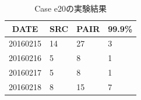 \documentclass[twocolumn,9pt]{ltjsarticle}
\begin{document}
\begin{table}[htbp]
    \centering
    \caption{Case e20の実験結果}

    \begin{tabular}{c||lll}
        \hline
        DATE & SRC & PAIR & 99.9\% \\
        \hline \hline
        20160215  & 14 & 27 & 3 \\
        20160216  & 5  & 8  & 1 \\
        20160217  & 5  & 8  & 1 \\
        20160218  & 8  & 15 & 7 \\
        \hline
    \end{tabular}

    \label{tab:e20}
\end{table}
\end{document}
